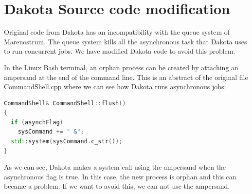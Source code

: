 \documentclass[12pt,a4paper,article]{memoir} %
\begin{document}
%
%
%
%
%
%
%
%


\chapter{Dakota Source code modification}
\label{chapter:CodeMod}

Original code from Dakota has an incompatibility with the queue system of Marenostrum. The queue system kills all the asynchronous task that Dakota uses to run concurrent jobs. We have modified Dakota code to avoid this problem.

In the Linux Bash terminal, an orphan process can be created by attaching an ampersand at the end of the command line. This is an abstract of the original file CommandShell.cpp where we can see how Dakota runs asynchronous jobs:

\begin{lstlisting}[style=MyCodeStyle,language=C++]
CommandShell& CommandShell::flush()
{
  if (asynchFlag)
    sysCommand += " &";
  std::system(sysCommand.c_str());
}
\end{lstlisting}

As we can see, Dakota makes a system call using the ampersand when the asynchronous flag is true. In this case, the new process is orphan and this can became a problem. If we want to avoid this, we can not use the ampersand.
\end{document}
